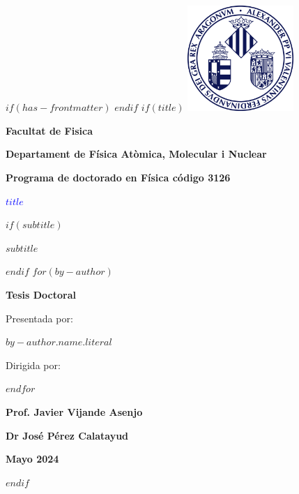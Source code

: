$if(has-frontmatter)$
\frontmatter
$endif$
$if(title)$
\thispagestyle{empty}
\centering
\vspace*{-1cm} %
\includegraphics[width=0.3\textwidth]{logouni} %
\vfill
{\Large\bfseries Facultat de Fisica \par}
{\Large\bfseries Departament de Física Atòmica, Molecular i Nuclear \par}
{\Large\bfseries Programa de doctorado en Física código 3126 \par}
{\textcolor{blue}{\Huge\bfseries $title$} \par}
$if(subtitle)$
\vspace{3ex}
{\Large\bfseries $subtitle$ \par}
$endif$
\vspace{3ex}
$for(by-author)$
{\Large\bfseries Tesis Doctoral \par}
{\Large Presentada por: \par}
{\Large\bfseries $by-author.name.literal$ \par}
{\Large Dirigida por: \par}
\vspace{3ex}
$endfor$%
\begin{minipage}[t]{0.4\textwidth}
    \centering
    {\Large\bfseries Prof. Javier Vijande Asenjo \par}
\end{minipage}
\hfill
\begin{minipage}[t]{0.4\textwidth}
    \centering
    {\Large\bfseries Dr José Pérez Calatayud \par}
\end{minipage}

\vfill %

{\bfseries\large Mayo 2024 \par}
$endif$
